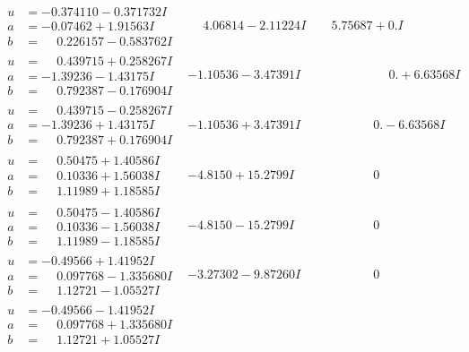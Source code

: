 \documentclass[1p]{elsarticle_modified}
\theoremstyle{definition}
\begin{document}
$$\begin{array}{c|c|c}
\begin{aligned}
u &= -0.374110 - 0.371732 I \\
a &= -0.07462 + 1.91563 I \\
b &= \phantom{-}0.226157 - 0.583762 I\end{aligned}
 & \phantom{-}4.06814 - 2.11224 I & \phantom{-}5.75687 + 0. I\phantom{ +0.000000I} \\ \hline\begin{aligned}
u &= \phantom{-}0.439715 + 0.258267 I \\
a &= -1.39236 - 1.43175 I \\
b &= \phantom{-}0.792387 - 0.176904 I\end{aligned}
 & -1.10536 - 3.47391 I & \phantom{-0.000000 -}0. + 6.63568 I \\ \hline\begin{aligned}
u &= \phantom{-}0.439715 - 0.258267 I \\
a &= -1.39236 + 1.43175 I \\
b &= \phantom{-}0.792387 + 0.176904 I\end{aligned}
 & -1.10536 + 3.47391 I & \phantom{-0.000000 } 0. - 6.63568 I \\ \hline\begin{aligned}
u &= \phantom{-}0.50475 + 1.40586 I \\
a &= \phantom{-}0.10336 + 1.56038 I \\
b &= \phantom{-}1.11989 + 1.18585 I\end{aligned}
 & -4.8150 + 15.2799 I & \phantom{-0.000000 } 0 \\ \hline\begin{aligned}
u &= \phantom{-}0.50475 - 1.40586 I \\
a &= \phantom{-}0.10336 - 1.56038 I \\
b &= \phantom{-}1.11989 - 1.18585 I\end{aligned}
 & -4.8150 - 15.2799 I & \phantom{-0.000000 } 0 \\ \hline\begin{aligned}
u &= -0.49566 + 1.41952 I \\
a &= \phantom{-}0.097768 - 1.335680 I \\
b &= \phantom{-}1.12721 - 1.05527 I\end{aligned}
 & -3.27302 - 9.87260 I & \phantom{-0.000000 } 0 \\ \hline\begin{aligned}
u &= -0.49566 - 1.41952 I \\
a &= \phantom{-}0.097768 + 1.335680 I \\
b &= \phantom{-}1.12721 + 1.05527 I\end{aligned}

\end{array}$$
\end{document}
